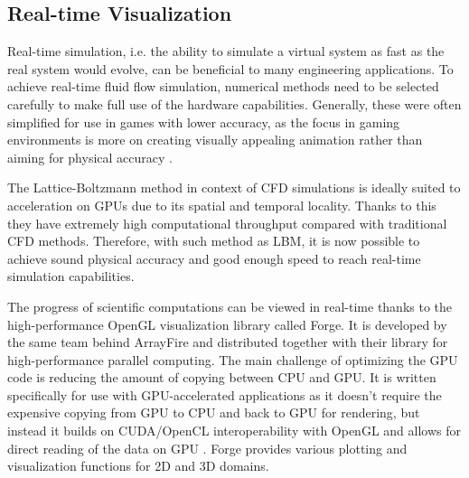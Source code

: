 \subsection{Real-time Visualization}
\label{rt-viz}
Real-time simulation, i.e. the ability to simulate a virtual system as fast as the real system would evolve, can be beneficial to many engineering applications. To achieve real-time fluid flow simulation, numerical methods need to be selected carefully to make full use of the hardware capabilities. Generally, these were often simplified for use in games with lower accuracy, as the focus in gaming environments is more on creating visually appealing animation rather than aiming for physical accuracy \citep{delboscRealTimeSimulationIndoor}.

The Lattice-Boltzmann method in context of CFD simulations is ideally suited to acceleration on GPUs due to its spatial and temporal locality. Thanks to this they have extremely high computational throughput compared with traditional CFD methods. Therefore, with such method as LBM, it is now possible to achieve sound physical accuracy and good enough speed to reach real-time simulation capabilities.

The progress of scientific computations can be viewed in real-time thanks to the high-performance OpenGL visualization library called Forge. It is developed by the same team behind ArrayFire and distributed together with their library for high-performance parallel computing. The main challenge of optimizing the GPU code is reducing the amount of copying between CPU and GPU. It is written specifically for use with GPU-accelerated applications as it doesn't require the expensive copying from GPU to CPU and back to GPU for rendering, but instead it builds on CUDA/OpenCL interoperability with OpenGL and allows for direct reading of the data on GPU \citep{forge2016}. Forge provides various plotting and visualization functions for 2D and 3D domains.

